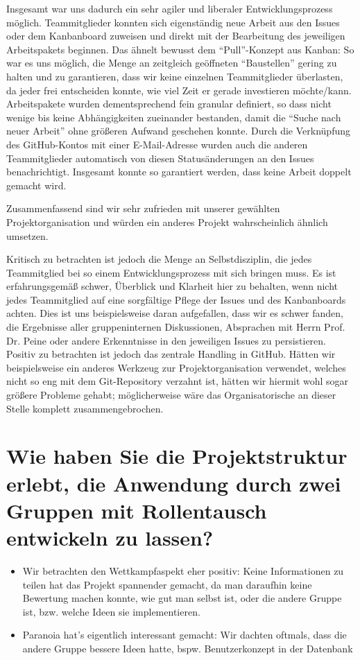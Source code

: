 \documentclass[12pt,DIV14,BCOR10mm,a4paper,parskip=half-,headsepline,headinclude,english,ngerman,bibliography=totocnumbered]{scrreprt}
\begin{document}
Insgesamt war uns dadurch ein sehr agiler und liberaler Entwicklungsprozess möglich.
Teammitglieder konnten sich eigenständig neue Arbeit aus den Issues oder dem Kanbanboard zuweisen und direkt mit der Bearbeitung des jeweiligen Arbeitspakets beginnen. Das ähnelt bewusst dem \enquote{Pull}-Konzept aus Kanban: So war es uns möglich, die Menge an zeitgleich geöffneten \enquote{Baustellen} gering zu halten und zu garantieren, dass wir keine einzelnen Teammitglieder überlasten, da jeder frei entscheiden konnte, wie viel Zeit er gerade investieren möchte/kann.
Arbeitspakete wurden dementsprechend fein granular definiert, so dass nicht wenige bis keine Abhängigkeiten zueinander bestanden, damit die \enquote{Suche nach neuer Arbeit} ohne größeren Aufwand geschehen konnte.
Durch die Verknüpfung des GitHub-Kontos mit einer E-Mail-Adresse wurden auch die anderen Teammitglieder automatisch von diesen Statusänderungen an den Issues benachrichtigt.
Insgesamt konnte so garantiert werden, dass keine Arbeit doppelt gemacht wird.

Zusammenfassend sind wir sehr zufrieden mit unserer gewählten Projektorganisation und würden ein anderes Projekt wahrscheinlich ähnlich umsetzen.

Kritisch zu betrachten ist jedoch die Menge an Selbstdisziplin, die jedes Teammitglied bei so einem Entwicklungsprozess mit sich bringen muss.
Es ist erfahrungsgemäß schwer, Überblick und Klarheit hier zu behalten, wenn nicht jedes Teammitglied auf eine sorgfältige Pflege der Issues und des Kanbanboards achten.
Dies ist uns beispielsweise daran aufgefallen, dass wir es schwer fanden, die Ergebnisse aller gruppeninternen Diskussionen, Absprachen mit Herrn Prof. Dr. Peine oder andere Erkenntnisse in den jeweiligen Issues zu persistieren.
Positiv zu betrachten ist jedoch das zentrale Handling in GitHub. Hätten wir beispielsweise ein anderes Werkzeug zur Projektorganisation verwendet, welches nicht so eng mit dem Git-Repository verzahnt ist, hätten wir hiermit wohl sogar größere Probleme gehabt; möglicherweise wäre das Organisatorische an dieser Stelle komplett zusammengebrochen.

\section{Wie haben Sie die Projektstruktur erlebt, die Anwendung durch zwei Gruppen mit Rollentausch entwickeln zu lassen?}

\begin{itemize}
  \item Wir betrachten den Wettkampfaspekt eher positiv: Keine Informationen zu teilen hat das Projekt spannender gemacht, da man daraufhin keine Bewertung machen konnte, wie gut man selbst ist, oder die andere Gruppe ist, bzw. welche Ideen sie implementieren.
  \item Paranoia hat's eigentlich interessant gemacht: Wir dachten oftmals, dass die andere Gruppe bessere Ideen hatte, bspw. Benutzerkonzept in der Datenbank
\end{itemize}
\end{document}
